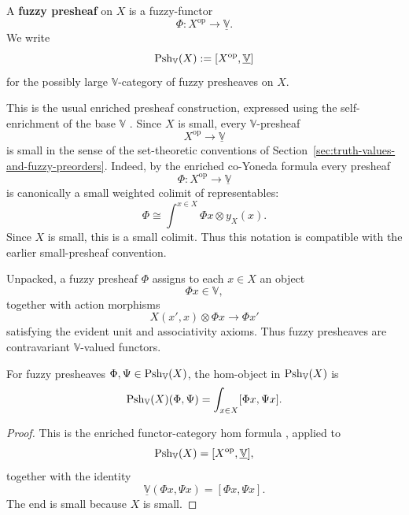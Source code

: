 \begin{definition}
\label{def:fuzzy-presheaf-cosmos}
    A \textbf{fuzzy presheaf} on \(X\) is a fuzzy-functor
    \[
        \Phi:X^{\mathrm{op}}\to \underline{\mathbb V}.
    \]
    We write
    \[
        \mathrm{Psh}_{\mathbb V}(X)
        :=
        [X^{\mathrm{op}},\underline{\mathbb V}]
    \]
    for the possibly large \(\mathbb V\)-category of fuzzy presheaves on
    \(X\).
\end{definition}

This is the usual enriched presheaf construction, expressed using the self-enrichment of the base \(\mathbb V\) \cite[Sections~1.6 and~1.9]{Kelly1982BasicConcepts}. Since \(X\) is small, every \(\mathbb V\)-presheaf
\[
    X^{\mathrm{op}}\to \underline{\mathbb V}
\]
is small in the sense of the set-theoretic conventions of Section~\ref{sec:truth-values-and-fuzzy-preorders}. Indeed, by the enriched co-Yoneda formula every presheaf
\[
    \Phi:X^{\mathrm{op}}\to\underline{\mathbb V}
\]
is canonically a small weighted colimit of representables:
\[
    \Phi
    \cong
    \int^{x\in X} \Phi x\otimes y_X(x).
\]
Since \(X\) is small, this is a small colimit. Thus this notation is compatible with the earlier small-presheaf convention.

Unpacked, a fuzzy presheaf \(\Phi\) assigns to each \(x\in X\) an object
\[
    \Phi x\in\mathbb V,
\]
together with action morphisms
\[
    X(x',x)\otimes \Phi x
    \longrightarrow
    \Phi x'
\]
satisfying the evident unit and associativity axioms. Thus fuzzy presheaves are contravariant \(\mathbb V\)-valued functors.

\begin{proposition}
\label{prop:fuzzy-presheaf-hom-objects}
    For fuzzy presheaves \(\Phi,\Psi\in \mathrm{Psh}_{\mathbb V}(X)\), the hom-object in \(\mathrm{Psh}_{\mathbb V}(X)\) is
    \[
        \mathrm{Psh}_{\mathbb V}(X)(\Phi,\Psi)
        =
        \int_{x\in X}
        [\Phi x,\Psi x].
    \]
\end{proposition}

\begin{proof}
    This is the enriched functor-category hom formula \cite[Section~2.2, formula~(2.10)]{Kelly1982BasicConcepts}, applied to
    \[
        \mathrm{Psh}_{\mathbb V}(X)
        =
        [X^{\mathrm{op}},\underline{\mathbb V}],
    \]
    together with the identity
    \[
        \underline{\mathbb V}(\Phi x,\Psi x)=[\Phi x,\Psi x].
    \]
    The end is small because \(X\) is small.
\end{proof}

